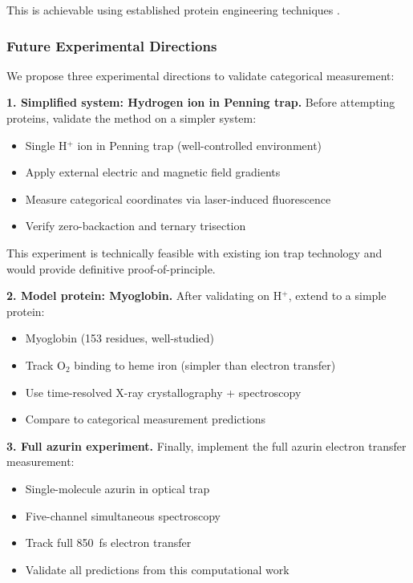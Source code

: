 \documentclass[twocolumn,10pt]{article}
\begin{document}
This is achievable using established protein engineering techniques \cite{Lu2009}.

\subsubsection{Future Experimental Directions}

We propose three experimental directions to validate categorical measurement:

\textbf{1. Simplified system: Hydrogen ion in Penning trap.} Before attempting 
proteins, validate the method on a simpler system:
%
\begin{itemize}
\item Single H$^+$ ion in Penning trap (well-controlled environment)
\item Apply external electric and magnetic field gradients
\item Measure categorical coordinates via laser-induced fluorescence
\item Verify zero-backaction and ternary trisection
\end{itemize}

This experiment is technically feasible with existing ion trap technology 
\cite{Wineland2013} and would provide definitive proof-of-principle.

\textbf{2. Model protein: Myoglobin.} After validating on H$^+$, extend to a 
simple protein:
%
\begin{itemize}
\item Myoglobin (153 residues, well-studied)
\item Track O$_2$ binding to heme iron (simpler than electron transfer)
\item Use time-resolved X-ray crystallography + spectroscopy
\item Compare to categorical measurement predictions
\end{itemize}

\textbf{3. Full azurin experiment.} Finally, implement the full azurin electron 
transfer measurement:
%
\begin{itemize}
\item Single-molecule azurin in optical trap
\item Five-channel simultaneous spectroscopy
\item Track full 850~fs electron transfer
\item Validate all predictions from this computational work
\end{itemize}
\end{document}
